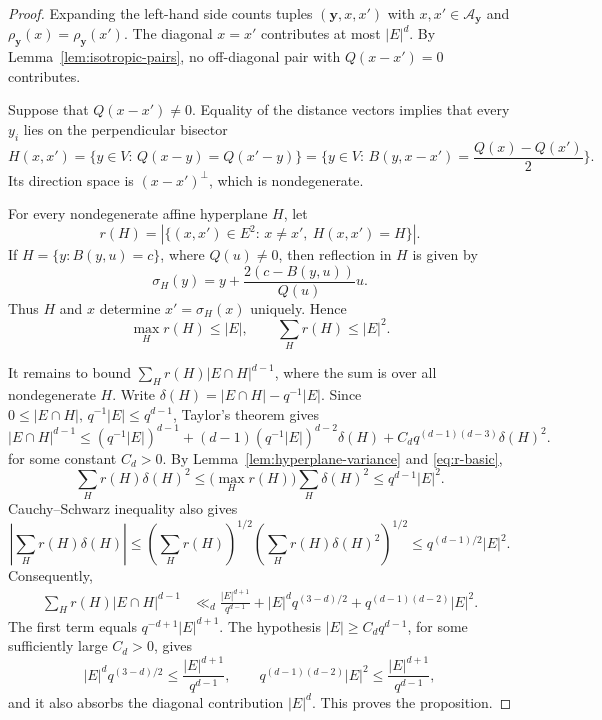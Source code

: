 \documentclass[11pt]{article}
\theoremstyle{remark}
\numberwithin{equation}{section}
\newcommand{\cA}{\mathcal A}
\newcommand{\1}{\mathbf 1}
\begin{document}
\begin{proof}
Expanding the left-hand side counts tuples $(\mathbf y,x,x')$ with $x,x'\in\cA_{\mathbf y}$ and $\rho_{\mathbf y}(x)=\rho_{\mathbf y}(x')$. The diagonal \(x=x'\) contributes at most $|E|^d$. By Lemma~\ref{lem:isotropic-pairs}, no off-diagonal pair with \(Q(x-x')=0\) contributes.

Suppose that \(Q(x-x')\ne0\). Equality of the distance vectors implies that every \(y_i\) lies on the perpendicular bisector
\[
 H(x,x')
 =
 \{y\in V: \, Q(x-y)=Q(x'-y)\}
 = \Big\{y\in V:\, B(y,x-x')=\frac{Q(x)-Q(x')}{2}\Big\}.
\]
Its direction space is \((x-x')^\perp\), which is nondegenerate. 

For every nondegenerate affine hyperplane \(H\), let
\[
r(H) = |\{(x,x')\in E^2: \, x\ne x', \ H(x,x')=H\}|.
\]
If \(H=\{y:B(y,u)=c\}\), where \(Q(u)\ne0\), then reflection in \(H\) is given by
\[
\sigma_H(y) = y+\frac{2(c-B(y,u))}{Q(u)}u.
\]
Thus \(H\) and \(x\) determine \(x'=\sigma_H(x)\) uniquely. Hence
\begin{equation}\label{eq:r-basic}
\max_Hr(H)\le |E|,\qquad \sum_Hr(H)\le |E|^2.
\end{equation}

It remains to bound $\sum_Hr(H)|E\cap H|^{d-1}$, where the sum is over all nondegenerate $H$. Write $\delta(H)=|E\cap H|-q^{-1}|E|$. Since $0\le |E\cap H|,\, q^{-1}|E|\le q^{d-1}$, Taylor's theorem gives
\[
 |E\cap H|^{d-1}
 \le
 (q^{-1}|E|)^{d-1}
 +
 (d-1)(q^{-1}|E|)^{d-2}\delta(H)
 +
C_d q^{(d-1)(d-3)}\delta(H)^2.
\]
for some constant $C_d>0$. 
By Lemma~\ref{lem:hyperplane-variance} and
\eqref{eq:r-basic},
\[
 \sum_H r(H)\delta(H)^2
 \le
 \bigl(\max_Hr(H)\bigr)
 \sum_H\delta(H)^2
 \le
 q^{d-1}|E|^2.
\]
Cauchy--Schwarz inequality also gives
\[
 \left|\sum_Hr(H)\delta(H)\right|
 \le
 \left(\sum_Hr(H)\right)^{1/2}
 \left(\sum_Hr(H)\delta(H)^2\right)^{1/2}
 \le
 q^{(d-1)/2}|E|^2.
\]
Consequently,
\begin{align*}
 \sum_Hr(H)|E\cap H|^{d-1}
 &\ll_d
 \frac{|E|^{d+1}}{q^{d-1}}
 +
 |E|^{d}q^{(3-d)/2}
 +
 q^{(d-1)(d-2)}|E|^2.
\end{align*}
The first term equals $q^{-d+1}|E|^{d+1}$. The hypothesis \(|E|\ge C_dq^{d-1}\), for some sufficiently large $C_d>0$, gives
\[
 |E|^dq^{(3-d)/2}
 \le
 \frac{|E|^{d+1}}{q^{d-1}},
 \qquad
 q^{(d-1)(d-2)}|E|^2
 \le
 \frac{|E|^{d+1}}{q^{d-1}},
\]
and it also absorbs the diagonal contribution \(|E|^d\). This proves
the proposition.
\end{proof}
\end{document}
